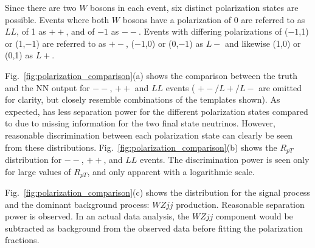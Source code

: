 Since there are two $W$ bosons in each event, six distinct polarization states are possible. Events where both $W$ bosons have a polarization of 0 are referred to as $LL$, of 1 as $++$, and of $-1$ as $--$. Events with differing polarizations of ($-1$,1) or (1,$-1$) are referred to as $+-$, ($-1$,0) or (0,$-1$) as $L-$ and likewise (1,0) or (0,1) as $L+$. 

Fig.~\ref{fig:polarization_comparison}(a) shows the comparison between the truth \cts and 
the NN output \ctsNN for $--$, $++$ and $LL$ events ( $+-/L+/L-$ are omitted for clarity, but closely resemble combinations of the templates shown). As expected, \ctsNN has less separation 
power for the different polarization states compared to \cts due to missing information for the two final state neutrinos. 
However, reasonable discrimination between each polarization state can clearly be seen from these distributions. 
Fig.~\ref{fig:polarization_comparison}(b) shows the $R_{pT}$ distribution for $--$, $++$, and $LL$ events. 
The discrimination power is seen only for large values of $R_{pT}$, and only apparent with a logarithmic scale.

Fig.~\ref{fig:polarization_comparison}(c) shows the \ctsNN
distribution for the signal \ssWW process and the dominant background
process: $WZjj$ production.  Reasonable separation power is observed. In an actual
data analysis, the $WZjj$ component would be subtracted as background
from the observed data before fitting the polarization fractions.

